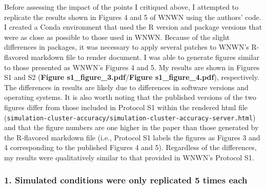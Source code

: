 \documentclass[
]{article}
\begin{document}
Before assessing the impact of the points I critiqued above, I attempted
to replicate the results shown in Figures 4 and 5 of WNWN using the
authors' code. I created a Conda environment that used the R version and
package versions that were as close as possible to those used in WNWN.
Because of the slight differences in packages, it was necessary to apply
several patches to WNWN's R-flavored markdown file to render document. I
was able to generate figures similar to those presented as WNWN's
Figures 4 and 5. My results are shown in Figures S1 and S2
(\textbf{Figure s1\_figure\_3.pdf}/\textbf{Figure s1\_figure\_4.pdf}),
respectively. The differences in results are likely due to differences
in software versions and operating systems. It is also worth noting that
the published versions of the two figures differ from those included in
Protocol S1 within the rendered html file
(\texttt{simulation-cluster-accuracy/simulation-cluster-accuracy-server.html})
and that the figure numbers are one higher in the paper than those
generated by the R-flavored markdown file (i.e., Protocol S1 labels the
figures as Figures 3 and 4 corresponding to the published Figures 4 and
5). Regardless of the differences, my results were qualitatively similar
to that provided in WNWN's Protocol S1.

\hypertarget{simulated-conditions-were-only-replicated-5-times-each}{%
\subsubsection{1. Simulated conditions were only replicated 5 times
each}\label{simulated-conditions-were-only-replicated-5-times-each}}
\end{document}
